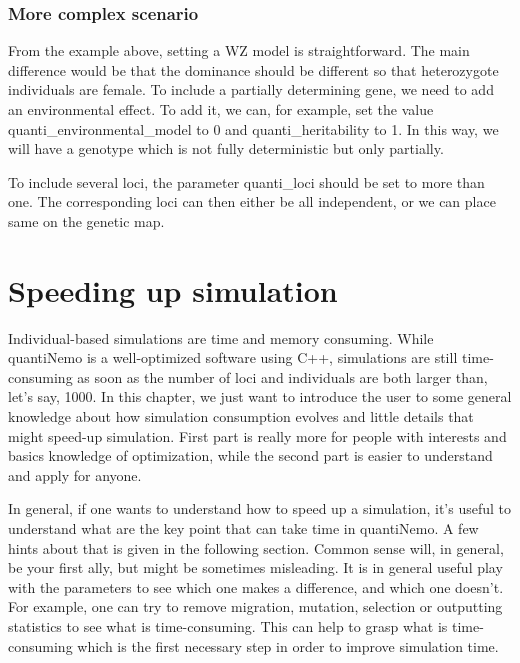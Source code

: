 \documentclass[letterpaper,12pt,oneside]{book}
\begin{document}
\begin{appendices}
\subsection{More complex scenario}
From the example above, setting a WZ model is straightforward. The main difference would be that the dominance should be different so that heterozygote individuals are female. 
To include a partially determining gene, we need to add an environmental effect.  To add it, we can, for example, set the value \textsf{quanti\_environmental\_model} to 0 and \textsf{quanti\_heritability} to 1. In this way, we will have a genotype which is not fully deterministic but only partially. 
   
To include several loci, the parameter \textsf{quanti\_loci} should be set to more than one. The corresponding loci can then either be all independent, or we can place same on the genetic map. 






\chapter{Speeding up simulation}\label{chap:SpeedingUpSimulation}
Individual-based simulations are time and memory consuming. While quantiNemo is a well-optimized software using C++, simulations are still time-consuming as soon as the number of loci and individuals are both larger than, let's say, 1000. In this chapter, we just want to introduce the user to some general knowledge about how simulation consumption evolves and little details that might speed-up simulation. First part is really more for people with interests and basics knowledge of optimization, while the second part is easier to understand and apply for anyone. 

In general, if one wants to understand how to speed up a simulation, it's useful to understand what are the key point that can take time in quantiNemo. A few hints about that is given in the following section. Common sense will, in general, be your first ally, but might be sometimes misleading. It is in general useful play with the parameters to see which one makes a difference, and which one doesn't. For example, one can try to remove migration, mutation, selection or outputting statistics to see what is time-consuming. This can help to grasp what is time-consuming which is the first necessary step in order to improve simulation time. 

\end{appendices}
\end{document}
